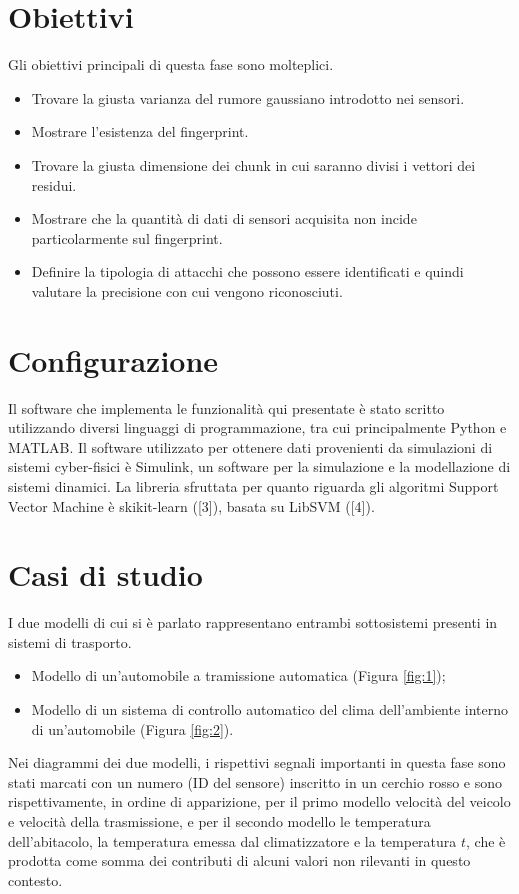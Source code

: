 \documentclass[Lau,binding=0.6cm]{sapthesis}
\begin{document}
\section{Obiettivi}\label{sec:1}
Gli obiettivi principali di questa fase sono molteplici.
\begin{itemize}
    \item Trovare la giusta varianza del rumore gaussiano introdotto nei sensori.
    \item Mostrare l'esistenza del fingerprint.
    \item Trovare la giusta dimensione dei chunk in cui saranno divisi i vettori dei residui.
    \item Mostrare che la quantit\`a di dati di sensori acquisita non incide particolarmente sul fingerprint.
    \item Definire la tipologia di attacchi che possono essere identificati e quindi valutare la precisione con cui vengono riconosciuti.
 \end{itemize}

\section{Configurazione}
Il software che implementa le funzionalit\`a qui presentate \`e stato scritto utilizzando diversi linguaggi di programmazione, tra cui principalmente Python e MATLAB.
Il software utilizzato per ottenere dati provenienti da simulazioni di sistemi cyber-fisici \`e Simulink, un software per la simulazione e la modellazione di sistemi dinamici.
La libreria sfruttata per quanto riguarda gli algoritmi Support Vector Machine \`e skikit-learn ([3]), basata su LibSVM ([4]).

\newpage
\section{Casi di studio}
I due modelli di cui si \`e parlato rappresentano entrambi sottosistemi presenti in sistemi di trasporto.
\begin{itemize}
    \item Modello di un'automobile a tramissione automatica (Figura \ref{fig:1});
    \item Modello di un sistema di controllo automatico del clima dell'ambiente interno di un'automobile (Figura \ref{fig:2}).
\end{itemize}
Nei diagrammi dei due modelli, i rispettivi segnali importanti in questa fase sono stati marcati con un numero (ID del sensore) inscritto in un cerchio rosso e sono rispettivamente, 
in ordine di apparizione, per il primo modello velocit\`a del veicolo e velocit\`a della trasmissione, e per il secondo modello le temperatura dell'abitacolo, la temperatura emessa dal climatizzatore e la temperatura $t$, che \`e prodotta come somma dei contributi di alcuni valori non rilevanti in questo contesto.
\end{document}
